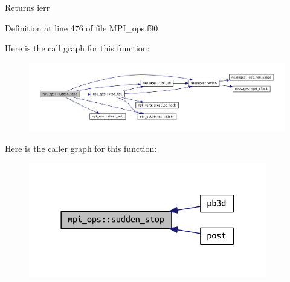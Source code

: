 \begin{DoxyReturn}{Returns}
ierr 
\end{DoxyReturn}


Definition at line 476 of file M\+P\+I\+\_\+ops.\+f90.

Here is the call graph for this function\+:\nopagebreak
\begin{figure}[H]
\begin{center}
\leavevmode
\includegraphics[width=350pt]{namespacempi__ops_a40e8610357a9a5b075fef9dab1c3f24f_cgraph}
\end{center}
\end{figure}
Here is the caller graph for this function\+:\nopagebreak
\begin{figure}[H]
\begin{center}
\leavevmode
\includegraphics[width=294pt]{namespacempi__ops_a40e8610357a9a5b075fef9dab1c3f24f_icgraph}
\end{center}
\end{figure}
